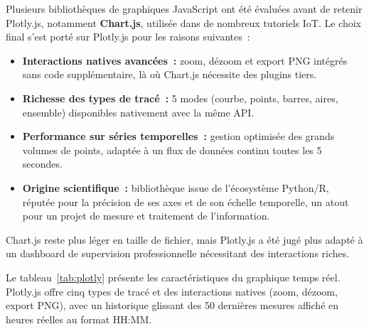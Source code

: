 \documentclass[12pt, a4paper]{report}
\begin{document}
\begin{infobox}
Plusieurs biblioth\`eques de graphiques JavaScript ont \'et\'e
\'evalu\'ees avant de retenir Plotly.js, notamment \textbf{Chart.js},
utilis\'ee dans de nombreux tutoriels IoT. Le choix final s'est port\'e
sur Plotly.js pour les raisons suivantes~:
\begin{itemize}[leftmargin=0.8cm, itemsep=3pt]
  \item[\ding{51}] \textbf{Interactions natives avanc\'ees~:} zoom,
        d\'ezoom et export PNG int\'egr\'es sans code suppl\'ementaire,
        l\`a o\`u Chart.js n\'ecessite des plugins tiers.
  \item[\ding{51}] \textbf{Richesse des types de trac\'e~:} 5 modes
        (courbe, points, barres, aires, ensemble) disponibles
        nativement avec la m\^eme API.
  \item[\ding{51}] \textbf{Performance sur s\'eries temporelles~:}
        gestion optimis\'ee des grands volumes de points, adapt\'ee
        \`a un flux de donn\'ees continu toutes les 5 secondes.
  \item[\ding{51}] \textbf{Origine scientifique~:} biblioth\`eque
        issue de l'\'ecosyst\`eme Python/R, r\'eput\'ee pour la
        pr\'ecision de ses axes et de son \'echelle temporelle,
        un atout pour un projet de mesure et traitement de
        l'information.
\end{itemize}
Chart.js reste plus l\'eger en taille de fichier, mais Plotly.js a
\'et\'e jug\'e plus adapt\'e \`a un dashboard de supervision
professionnelle n\'ecessitant des interactions riches.
\end{infobox}

Le tableau~\ref{tab:plotly} pr\'esente les caract\'eristiques du
graphique temps r\'eel. Plotly.js offre cinq types de trac\'e et des
interactions natives (zoom, d\'ezoom, export PNG), avec un historique
glissant des 50 derni\`eres mesures affich\'e en heures r\'eelles au
format HH:MM.
\end{document}
